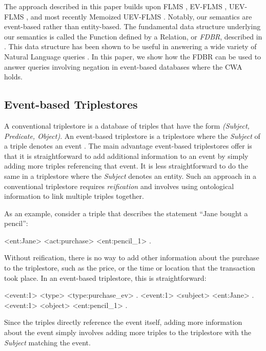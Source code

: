 \documentclass[../main.tex]{subfiles}
\begin{document}
\begin{refsection}
\noindent The approach described in this paper builds upon FLMS \cite{frost1989constructing}, EV-FLMS \cite{frost2014demonstration}, UEV-FLMS \cite{peelar2016accommodating}, and most recently
Memoized UEV-FLMS \cite{peelar2020webistjournal}.  Notably, our semantics are event-based rather than entity-based.  The fundamental data structure underlying our semantics is called the Function defined by a Relation, or \textit{FDBR}, described in .  This data structure has been shown to be useful in answering a wide variety of Natural Language queries \cite{frostpeelar2019}.  In this paper, we show how the FDBR can be used to answer queries involving negation in event-based databases where the CWA holds.

\subsection{Event-based Triplestores}

A conventional triplestore is a database of triples that have the form \textit{(Subject, Predicate, Object)}.
An event-based triplestore is a triplestore where the \textit{Subject} of a triple denotes an event \cite{frost2013event}\cite{frost2014demonstration}.
The main advantage event-based triplestores offer is that it is straightforward to add additional
information to an event by simply adding more triples referencing that event.  It is less straightforward to do the same in a triplestore where the \textit{Subject} denotes an entity.
Such an approach in a conventional triplestore requires \textit{reification} and involves using ontological information to link multiple triples together.

As an example, consider a triple that describes the statement ``Jane bought a pencil'':
\begin{code}
    <ent:Jane> <act:purchase> <ent:pencil_1> .
\end{code}
Without reification, there is no way to add other information about the purchase to the triplestore, such as the price, or the time or location that the transaction took place.
In an event-based triplestore, this is straightforward:
\begin{code}
    <event:1> <type> <type:purchase_ev> .
    <event:1> <subject> <ent:Jane> .
    <event:1> <object> <ent:pencil_1> .
\end{code}
Since the triples directly reference the event itself, adding more information about the event simply involves adding more triples to the triplestore with the \textit{Subject} matching the event.


\end{refsection}
\end{document}
